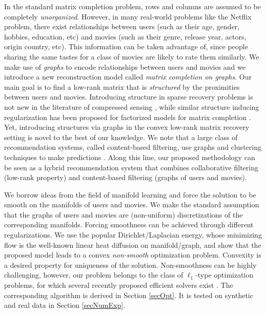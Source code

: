 \documentclass{article}
\begin{document}
In the standard matrix completion problem, rows and columns are assumed to be completely {\it unorganized}. However, in many real-world problems like the Netflix problem, there exist relationships between users (such as their age, gender, hobbies, education, etc) and movies (such as their genre, release year, actors, origin country, etc). This information can be taken advantage of, since people sharing the same tastes for a class of movies are likely to rate them similarly. We make use of {\it graphs} to encode relationships between users and movies and we introduce a new reconstruction model called {\it matrix completion on graphs}. Our main goal is to find a low-rank matrix that is {\it structured} by the proximities between users and movies. 
Introducing structure in sparse recovery problems is not new in the literature of compressed sensing  \cite{pro:HuangZhangMetaxas09StrucSpars,art:BaraniukCevherDuarteHegde10SparStru, art:JenattonAudibertBach11SparStru}, while similar structure inducing regularization has been proposed for factorized models for matrix completion \cite{ma2011recommender}. Yet, introducing structures via graphs in the convex low-rank matrix recovery setting is novel to the best of our knowledge. 
We note that a large class of recommendation systems, called content-based filtering, use graphs and clustering techniques to make predictions \cite{huang2002graph}. Along this line, our proposed methodology can be seen as a hybrid recommendation system that combines collaborative filtering (low-rank property) and content-based filtering (graphs of users and movies).  

We borrow ideas from the field of manifold learning \cite{belkin2001laplacian,belkin2003laplacian} and force the solution to be smooth on the manifolds of users and movies. We make the standard assumption that the graphs of users and movies are (non-uniform) discretizations of the corresponding manifolds. Forcing smoothness can be achieved through different regularizations. We use the popular Dirichlet/Laplacian energy, whose minimizing flow is the well-known linear heat diffusion on manifold/graph, and show that the proposed model leads to a convex {\it non-smooth} optimization problem. Convexity is a desired property for uniqueness of the solution. Non-smoothness can be highly challenging, however, our problem belongs to the class of $\ell_1$-type optimization problems, for which several recently proposed efficient solvers exist \cite{boyd2011distributed,combettes2011proximal,nesterov2013first}.  The corresponding algorithm is derived in Section \ref{secOpt}. It is tested on synthetic and real data \cite{pro:Miller03MovieLens} in Section \ref{secNumExp}.
\end{document}
